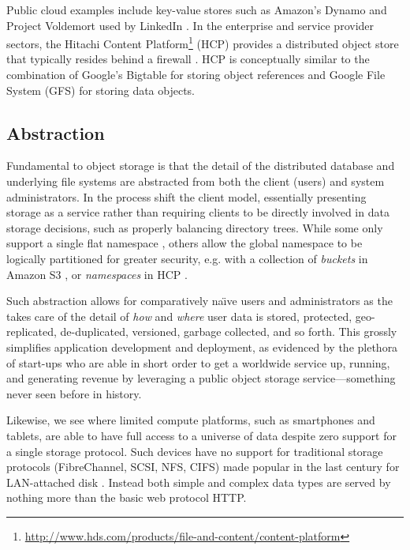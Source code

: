 Public cloud examples include key-value stores such as Amazon's Dynamo \cite{DeCandia:2007:DAH:1323293.1294281} and Project Voldemort used by LinkedIn \cite{Sumbaly:2012:SLB:2208461.2208479}. In the enterprise and service provider sectors, the Hitachi Content Platform\footnote{\href{http://www.hds.com/products/file-and-content/content-platform}{http://www.hds.com/products/file-and-content/content-platform}}  (HCP) provides a distributed object store that typically resides behind a firewall \cite{RJP:2010:DOS-POP}. HCP is conceptually similar to the combination of Google's Bigtable \cite{Chang:2008:BDS:1365815.1365816} for storing object references and Google File System (GFS) \cite{Ghemawat:2003:GFS:945445.945450} for storing data objects.

\subsection{Abstraction}
Fundamental to object storage is that the detail of the distributed database and underlying file systems are abstracted from both the client \apps{} (users) and system administrators. In the process \oss{} shift the client model, essentially presenting storage as a service rather than requiring clients to be directly involved in data storage decisions, such as properly balancing directory trees. While some \oss{} only support a single flat namespace \cite{RJP:2005:CA}, others allow the global namespace to be logically partitioned for greater security, e.g. with a collection of \emph{buckets} in Amazon S3 \cite{varia2008cloud}, or \emph{namespaces} in HCP \cite{MR:2013:HCP-ARCH}.

Such abstraction allows for comparatively na\"{\i}ve users and administrators as the \os{} takes care of the detail of \emph{how} and \emph{where} user data is stored, protected, geo-replicated,  de-duplicated, versioned, garbage collected, and so forth. This grossly simplifies application development and deployment, as evidenced by the plethora of start-ups who are able in short order to get a worldwide service up, running, and generating revenue by leveraging a public object storage service---something never seen before in history.

Likewise, we see where limited compute platforms, such as smartphones and tablets, are able to have full access to a universe of data despite zero support for a single storage protocol. Such devices have no support for traditional storage protocols (FibreChannel, SCSI, NFS, CIFS) made popular in the last century for LAN-attached disk \cite{gibson1998cost}. Instead both simple and complex data types are served by nothing more than the basic web protocol HTTP.

